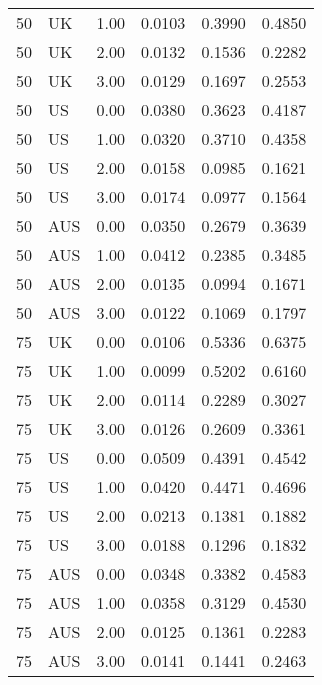 \begin{table}[ht]
\begin{tabular}{llrlll}
  50 & UK & 1.00 & 0.0103 & 0.3990 & 0.4850 \\ 
  50 & UK & 2.00 & 0.0132 & 0.1536 & 0.2282 \\ 
  50 & UK & 3.00 & 0.0129 & 0.1697 & 0.2553 \\ 
  50 & US & 0.00 & 0.0380 & 0.3623 & 0.4187 \\ 
  50 & US & 1.00 & 0.0320 & 0.3710 & 0.4358 \\ 
  50 & US & 2.00 & 0.0158 & 0.0985 & 0.1621 \\ 
  50 & US & 3.00 & 0.0174 & 0.0977 & 0.1564 \\ 
  50 & AUS & 0.00 & 0.0350 & 0.2679 & 0.3639 \\ 
  50 & AUS & 1.00 & 0.0412 & 0.2385 & 0.3485 \\ 
  50 & AUS & 2.00 & 0.0135 & 0.0994 & 0.1671 \\ 
  50 & AUS & 3.00 & 0.0122 & 0.1069 & 0.1797 \\ 
  75 & UK & 0.00 & 0.0106 & 0.5336 & 0.6375 \\ 
  75 & UK & 1.00 & 0.0099 & 0.5202 & 0.6160 \\ 
  75 & UK & 2.00 & 0.0114 & 0.2289 & 0.3027 \\ 
  75 & UK & 3.00 & 0.0126 & 0.2609 & 0.3361 \\ 
  75 & US & 0.00 & 0.0509 & 0.4391 & 0.4542 \\ 
  75 & US & 1.00 & 0.0420 & 0.4471 & 0.4696 \\ 
  75 & US & 2.00 & 0.0213 & 0.1381 & 0.1882 \\ 
  75 & US & 3.00 & 0.0188 & 0.1296 & 0.1832 \\ 
  75 & AUS & 0.00 & 0.0348 & 0.3382 & 0.4583 \\ 
  75 & AUS & 1.00 & 0.0358 & 0.3129 & 0.4530 \\ 
  75 & AUS & 2.00 & 0.0125 & 0.1361 & 0.2283 \\ 
  75 & AUS & 3.00 & 0.0141 & 0.1441 & 0.2463 \\ 
   \hline
\end{tabular}
\end{table}
